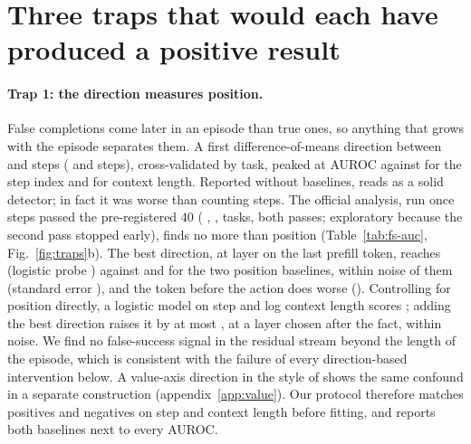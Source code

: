 \section{Three traps that would each have produced a positive result}
\label{sec:traps}


\paragraph{Trap 1: the direction measures position.} False completions come later in an episode than true ones, so anything that grows with the episode separates them. A first difference-of-means direction between \fsp{} and \fsm{} steps (\prvPos{} and \prvNeg{} steps), cross-validated by task, peaked at AUROC \prvAucPost{} against \prvBaseStep{} for the step index and \prvBaseCtx{} for context length. Reported without baselines, \prvAucPost{} reads as a solid detector; in fact it was worse than counting steps. The official analysis, run once \fsp{} steps passed the pre-registered 40 (\ofPos{} \fsp, \ofNeg{} \fsm, \ofTasks{} tasks, both passes; exploratory because the second pass stopped early), finds no more than position (Table~\ref{tab:fs-auc}, Fig.~\ref{fig:traps}b). The best direction, at layer \ofResidLayer{} on the last prefill token, reaches \ofResidAuc{} (logistic probe \ofResidLr) against \ofBaseStep{} and \ofBaseCtx{} for the two position baselines, within noise of them (standard error \ofResidSe), and the token before the action does worse (\ofPostAuc). Controlling for position directly, a logistic model on step and log context length scores \ofPosOnly; adding the best direction raises it by at most \ofPosGain, at a layer chosen after the fact, within noise. We find no false-success signal in the residual stream beyond the length of the episode, which is consistent with the failure of every direction-based intervention below. A value-axis direction in the style of \citet{jiang2026value} shows the same confound in a separate construction (appendix~\ref{app:value}). Our protocol therefore matches positives and negatives on step and context length before fitting, and reports both baselines next to every AUROC.


